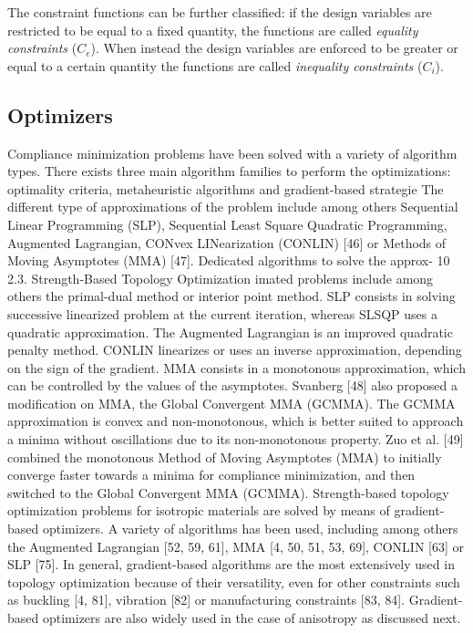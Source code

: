 The constraint functions can be further classified: if the design variables are restricted to be equal to a fixed quantity, the functions are called \textit{equality constraints} ($C_e$). When instead the design variables are enforced to be greater or equal to a certain quantity the functions are called \textit{inequality constraints} ($C_i$).

\subsection{Optimizers}
Compliance minimization problems have been solved with a variety of algorithm types. There exists three
main algorithm families to perform the optimizations: optimality criteria, metaheuristic algorithms and
gradient-based strategie
The different type of approximations of the problem include among others Sequential Linear Programming
(SLP), Sequential Least Square Quadratic Programming, Augmented Lagrangian, CONvex LINearization
(CONLIN) [46] or Methods of Moving Asymptotes (MMA) [47]. Dedicated algorithms to solve the approx-
10
2.3. Strength-Based Topology Optimization
imated problems include among others the primal-dual method or interior point method. SLP consists in
solving successive linearized problem at the current iteration, whereas SLSQP uses a quadratic approximation.
The Augmented Lagrangian is an improved quadratic penalty method. CONLIN linearizes or uses an inverse
approximation, depending on the sign of the gradient. MMA consists in a monotonous approximation, which
can be controlled by the values of the asymptotes. Svanberg [48] also proposed a modification on MMA, the
Global Convergent MMA (GCMMA). The GCMMA approximation is convex and non-monotonous, which
is better suited to approach a minima without oscillations due to its non-monotonous property. Zuo et
al. [49] combined the monotonous Method of Moving Asymptotes (MMA) to initially converge faster towards
a minima for compliance minimization, and then switched to the Global Convergent MMA (GCMMA).
Strength-based topology optimization problems for isotropic materials are solved by means of gradient-based
optimizers. A variety of algorithms has been used, including among others the Augmented Lagrangian [52,
59, 61], MMA [4, 50, 51, 53, 69], CONLIN [63] or SLP [75]. In general, gradient-based algorithms are the
most extensively used in topology optimization because of their versatility, even for other constraints such
as buckling [4, 81], vibration [82] or manufacturing constraints [83, 84]. Gradient-based optimizers are also
widely used in the case of anisotropy as discussed next.


